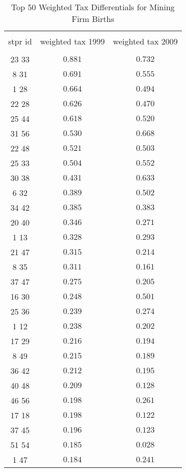 
\begin{table}[!htbp] \centering 
  \caption{Top 50 Weighted Tax Differentials for  Mining Firm Births} 
  \label{} 
\tiny 
\begin{tabular}{@{\extracolsep{5pt}} ccc} 
\\[-1.8ex]\hline 
\hline \\[-1.8ex] 
stpr id & weighted tax 1999 & weighted tax 2009 \\ 
\hline \\[-1.8ex] 
23 33  & $0.881$ & $0.732$ \\ 
8 31  & $0.691$ & $0.555$ \\ 
1 28  & $0.664$ & $0.494$ \\ 
22 28  & $0.626$ & $0.470$ \\ 
25 44  & $0.618$ & $0.520$ \\ 
31 56  & $0.530$ & $0.668$ \\ 
22 48  & $0.521$ & $0.503$ \\ 
25 33  & $0.504$ & $0.552$ \\ 
30 38  & $0.431$ & $0.633$ \\ 
6 32  & $0.389$ & $0.502$ \\ 
34 42  & $0.385$ & $0.383$ \\ 
20 40  & $0.346$ & $0.271$ \\ 
1 13  & $0.328$ & $0.293$ \\ 
21 47  & $0.315$ & $0.214$ \\ 
8 35  & $0.311$ & $0.161$ \\ 
37 47  & $0.275$ & $0.205$ \\ 
16 30  & $0.248$ & $0.501$ \\ 
25 36  & $0.239$ & $0.274$ \\ 
1 12  & $0.238$ & $0.202$ \\ 
17 29  & $0.216$ & $0.194$ \\ 
8 49  & $0.215$ & $0.189$ \\ 
36 42  & $0.212$ & $0.195$ \\ 
40 48  & $0.209$ & $0.128$ \\ 
46 56  & $0.198$ & $0.261$ \\ 
17 18  & $0.198$ & $0.122$ \\ 
37 45  & $0.196$ & $0.123$ \\ 
51 54  & $0.185$ & $0.028$ \\ 
1 47  & $0.184$ & $0.241$ \\ 

\end{tabular}
\end{table}
